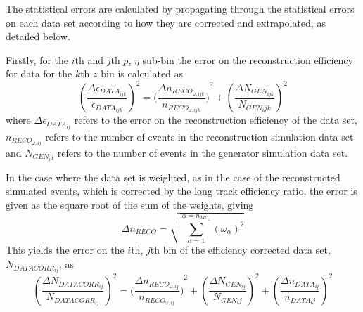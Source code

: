 
The statistical errors are calculated by propagating through the  statistical errors on each data set according to how they are corrected and extrapolated, as detailed below.

Firstly, for the $i$th and $j$th $p$, $\eta$ sub-bin the error on the reconstruction efficiency for data for the $k$th $z$ bin is calculated as
\begin{equation}
{(\frac{\Delta\epsilon_{DATA_{ijk}}}{\epsilon_{DATA_{ijk}}})}^{2}=({\frac{\Delta n_{RECO_{\omega,ijk}}}{n_{RECO_{\omega,ijk}}})}^{2} + {(\frac{\Delta N_{GEN_{ijk}}}{N_{GEN_ijk}})}^{2}
\end{equation} where
$\Delta\epsilon_{DATA_{ij}}$ refers to the error on the reconstruction efficiency of the data set, $n_{RECO_{\omega,ij}}$ refers to the number of events in the reconstruction simulation data set and $N_{GEN_ij}$ refers to the number of events in the generator simulation data set. 

In the case where the data set is weighted, as in the case of the reconstructed simulated events, which is corrected by the long track efficiency ratio, the error is given as the square root of the sum of the weights, giving 
\begin{equation}
\Delta n_{RECO}= \sqrt{\sum_{\alpha=1}^{\alpha=n_{MC_z}} {(\omega_{\alpha})}^{2}}
\end{equation}
 This yields the error on the $i$th, $j$th bin of the efficiency corrected data set, $N_{DATACORR_{ij}}$, as 
\begin{equation}
{(\frac{\Delta N_{DATACORR_{ij}}}{N_{DATACORR_{ij}}})}^{2}=({\frac{\Delta n_{RECO_{\omega,ij}}}{n_{RECO_{\omega,ij}}})}^{2} + {(\frac{\Delta N_{GEN_{ij}}}{N_{GEN_ij}})}^{2}+{(\frac{\Delta n_{DATA_{ij}}}{n_{DATA_ij}})}^{2}
\end{equation}

